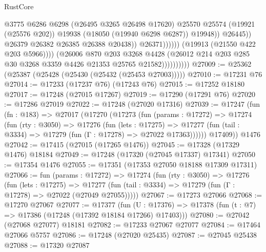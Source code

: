 \begin{lexlean}{RustCore}
\begin{coremodule}
                                                @3775
                                                @6286
                                                @6298
                                                (@26495 @3265 @26498 @17620)
                                                @25570
                                                @25574
                                                (@19921 (@25576 @202))
                                                @19938
                                                (@18050 (@19940 @6298 @6287))
                                                @19948))
                                            @26445))
                                        @26379
                                        @26382
                                        @26385
                                        @26388
                                        @20438))
                                    @26371))))))
                        (@19913 (@21550 @422 @203 @5966))))
                    (@26006
                      @870
                      @203
                      @3268
                      @4428
                      (@26012 @214 @203 @285 @30 @3268 @3359 @4426 @21353 @25765 @21582))))))))))
@27009 := @25362 (@25387 (@25428 (@25430 (@25432 (@25453 @27003)))))
@27010 := @17231 @76
@27014 := @17233 (@17237 @76) (@17243 @76)
@27015 := @17252 @18180
@27017 := @17248 (@27015 @17267)
@27019 := @17290 (@17291 @76)
@27020 := @17286 @27019
@27022 := @17248 (@27020 @17316)
@27039 := @17247
    (fun (fn : @183) =>
    @27017
      (@17270
        (@17273
          (fun (params : @17272) =>
          @17274
            (fun (rty : @3050) =>
            @17276
              (fun (lets : @17275) =>
              @17277 (fun (tail : @3334) => @17279 (fun (Γ : @17278) => @27022 @17363))))))
        @17409))
    @1476
@27042 := @17415 (@27015 (@17265 @1476))
@27045 := @17328 (@17329 @1476) @18184
@27049 := @17248 (@17320 (@27045 @17337) @17341)
@27050 := @17354 @1476
@27055 := @17351 (@17353 @27050 @18188 @17309 @17311)
@27066 := fun (params : @17272) =>
  @17274
    (fun (rty : @3050) =>
    @17276
      (fun (lets : @17275) =>
      @17277 (fun (tail : @3334) => @17279 (fun (Γ : @17278) => @27022 (@27049 @27055)))))
@27067 := @17273 @27066
@27068 := @17270 @27067
@27077 := @17377
    (fun (U : @17376) => @17378 (fun (t : @7) => @17386 (@17248 (@17392 @18184 @17266) @17403)))
@27080 := @27042 (@27068 @27077) @18181
@27082 := @17233 @27067 @27077
@27084 := @17464 @27066 @5757
@27086 := @17248 (@27020 @25435)
@27087 := @27045 @25438
@27088 := @17320 @27087

\end{coremodule}
\end{lexlean}
